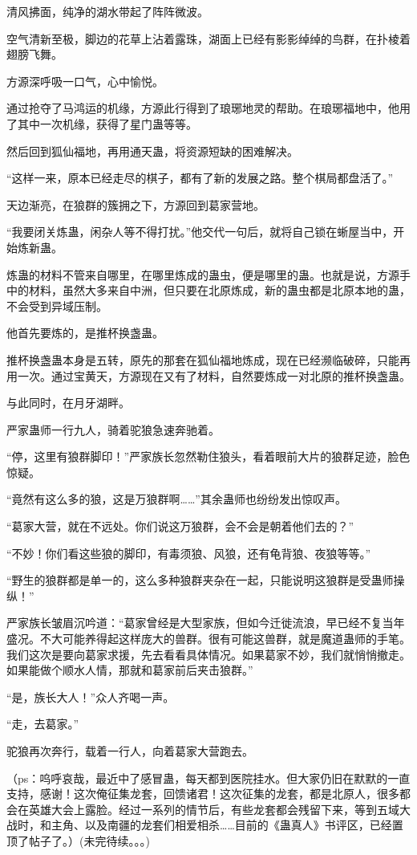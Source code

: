 \begin{this_body}
清风拂面，纯净的湖水带起了阵阵微波。

空气清新至极，脚边的花草上沾着露珠，湖面上已经有影影绰绰的鸟群，在扑棱着翅膀飞舞。

方源深呼吸一口气，心中愉悦。

通过抢夺了马鸿运的机缘，方源此行得到了琅琊地灵的帮助。在琅琊福地中，他用了其中一次机缘，获得了星门蛊等等。

然后回到狐仙福地，再用通天蛊，将资源短缺的困难解决。

“这样一来，原本已经走尽的棋子，都有了新的发展之路。整个棋局都盘活了。”

天边渐亮，在狼群的簇拥之下，方源回到葛家营地。

“我要闭关炼蛊，闲杂人等不得打扰。”他交代一句后，就将自己锁在蜥屋当中，开始炼新蛊。

炼蛊的材料不管来自哪里，在哪里炼成的蛊虫，便是哪里的蛊。也就是说，方源手中的材料，虽然大多来自中洲，但只要在北原炼成，新的蛊虫都是北原本地的蛊，不会受到异域压制。

他首先要炼的，是推杯换盏蛊。

推杯换盏蛊本身是五转，原先的那套在狐仙福地炼成，现在已经濒临破碎，只能再用一次。通过宝黄天，方源现在又有了材料，自然要炼成一对北原的推杯换盏蛊。

与此同时，在月牙湖畔。

严家蛊师一行九人，骑着驼狼急速奔驰着。

“停，这里有狼群脚印！”严家族长忽然勒住狼头，看着眼前大片的狼群足迹，脸色惊疑。

“竟然有这么多的狼，这是万狼群啊……”其余蛊师也纷纷发出惊叹声。

“葛家大营，就在不远处。你们说这万狼群，会不会是朝着他们去的？”

“不妙！你们看这些狼的脚印，有毒须狼、风狼，还有龟背狼、夜狼等等。”

“野生的狼群都是单一的，这么多种狼群夹杂在一起，只能说明这狼群是受蛊师操纵！”

严家族长皱眉沉吟道：“葛家曾经是大型家族，但如今迁徙流浪，早已经不复当年盛况。不大可能养得起这样庞大的兽群。很有可能这兽群，就是魔道蛊师的手笔。我们这次是要向葛家求援，先去看看具体情况。如果葛家不妙，我们就悄悄撤走。如果能做个顺水人情，那就和葛家前后夹击狼群。”

“是，族长大人！”众人齐喝一声。

“走，去葛家。”

驼狼再次奔行，载着一行人，向着葛家大营跑去。

（ps：呜呼哀哉，最近中了感冒蛊，每天都到医院挂水。但大家仍旧在默默的一直支持，感谢！这次俺征集龙套，回馈诸君！这次征集的龙套，都是北原人，很多都会在英雄大会上露脸。经过一系列的情节后，有些龙套都会残留下来，等到五域大战时，和主角、以及南疆的龙套们相爱相杀……目前的《蛊真人》书评区，已经置顶了帖子了。）(未完待续。。。)

\end{this_body}

